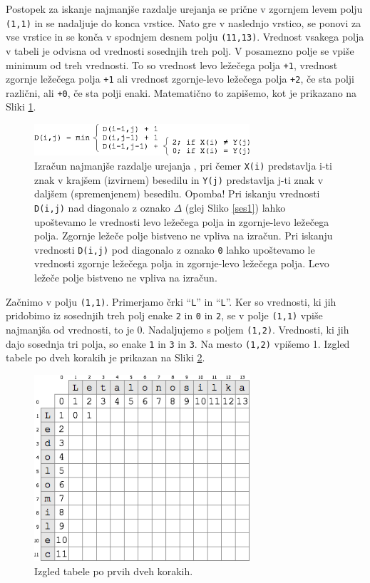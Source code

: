 \documentclass[a4paper, 12pt, twoside]{book}
\begin{document}
Postopek za iskanje najmanjše razdalje urejanja se prične v zgornjem levem polju {\tt (1,1)} in se nadaljuje do konca vrstice. Nato gre v naslednjo vrstico, se ponovi za vse vrstice in se konča v spodnjem desnem polju {\tt (11,13)}. Vrednost vsakega polja v tabeli je odvisna od vrednosti sosednjih treh polj. V posamezno polje se vpiše minimum od treh vrednosti. To so vrednost levo ležečega polja {\tt +1}, vrednost zgornje ležečega polja {\tt +1} ali vrednost zgornje-levo ležečega polja {\tt +2}, če sta polji različni, ali {\tt +0}, če sta polji enaki. Matematično to zapišemo, kot je prikazano na Sliki \ref{med2}.

\begin{figure}[placement h]
\begin{center}
\includegraphics[width=8cm]{med2.png}
\end{center}
\caption{Izračun najmanjše razdalje urejanja \cite{med}, pri čemer {\tt X(i)} predstavlja i-ti znak v krajšem (izvirnem) besedilu in {\tt Y(j)} predstavlja j-ti znak v daljšem (spremenjenem) besedilu. Opomba! Pri iskanju vrednosti {\tt D(i,j)} nad diagonalo z oznako {\tt $\Delta$} (glej Sliko \ref{ses1}) lahko upoštevamo le vrednosti levo ležečega polja in zgornje-levo ležečega polja. Zgornje ležeče polje bistveno ne vpliva na izračun. Pri iskanju vrednosti {\tt D(i,j)} pod diagonalo z oznako {\tt 0} lahko upoštevamo le vrednosti zgornje ležečega polja in zgornje-levo ležečega polja. Levo ležeče polje bistveno ne vpliva na izračun.}
\label{med2}
\end{figure}

\pagebreak

Začnimo v polju {\tt (1,1)}. Primerjamo črki “{\tt L}” in “{\tt L}”. Ker so vrednosti, ki jih pridobimo iz sosednjih treh polj enake {\tt 2} in {\tt 0} in {\tt 2}, se v polje {\tt (1,1)} vpiše najmanjša od vrednosti, to je 0. Nadaljujemo s poljem {\tt (1,2)}. Vrednosti, ki jih dajo sosednja tri polja, so enake {\tt 1} in {\tt 3} in {\tt 3}. Na mesto {\tt (1,2)} vpišemo 1. Izgled tabele po dveh korakih je prikazan na Sliki \ref{med3}.

\begin{figure}[placement h]
\begin{center}
\includegraphics[width=8cm]{med3.png}
\end{center}
\caption{Izgled tabele po prvih dveh korakih.}
\label{med3}
\end{figure}
\end{document}
